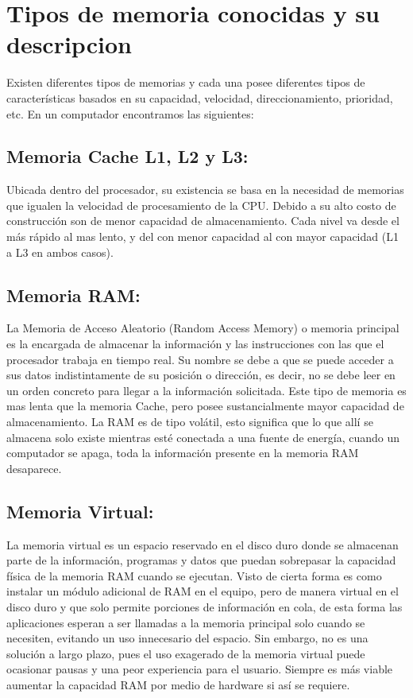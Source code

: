 \documentclass{article}
\begin{document}
\section{Tipos de memoria conocidas y su descripcion} \label{types}
Existen diferentes tipos de memorias y cada una posee diferentes tipos de características basados en su capacidad, velocidad, direccionamiento, prioridad, etc. En un computador encontramos las siguientes:

\subsection{Memoria Cache L1, L2 y L3: }
Ubicada dentro del procesador, su existencia se basa en la necesidad de memorias que igualen la velocidad de procesamiento de la CPU. Debido a su alto costo de construcción son de menor capacidad de almacenamiento. Cada nivel va desde el más rápido al mas lento, y del con menor capacidad al con mayor capacidad (L1 a L3 en ambos casos). \cite{augusto}

\subsection{Memoria RAM: }
La Memoria de Acceso Aleatorio (Random Access Memory) o memoria principal es la encargada de almacenar la información y las instrucciones con las que el procesador trabaja en tiempo real. Su nombre se debe a que se puede acceder a sus datos indistintamente de su posición o dirección, es decir, no se debe leer en un orden concreto para llegar a la información solicitada. Este tipo de memoria es mas lenta que la memoria Cache, pero posee sustancialmente mayor capacidad de almacenamiento. La RAM es de tipo volátil, esto significa que lo que allí se almacena solo existe mientras esté conectada a una fuente de energía, cuando un computador se apaga, toda la información presente en la memoria RAM desaparece.

\subsection{Memoria Virtual: }
La memoria virtual es un espacio reservado en el disco duro donde se almacenan parte de la información, programas y datos que puedan sobrepasar la capacidad física de la memoria RAM cuando se ejecutan. Visto de cierta forma es como instalar un módulo adicional de RAM en el equipo, pero de manera virtual en el disco duro y que solo permite porciones de información en cola, de esta forma las aplicaciones esperan a ser llamadas a la memoria principal solo cuando se necesiten, evitando un uso innecesario del espacio. Sin embargo, no es una solución a largo plazo, pues el uso exagerado de la memoria virtual puede ocasionar pausas y una peor experiencia para el usuario. Siempre es más viable aumentar la capacidad RAM por medio de hardware si así se requiere.
\end{document}
